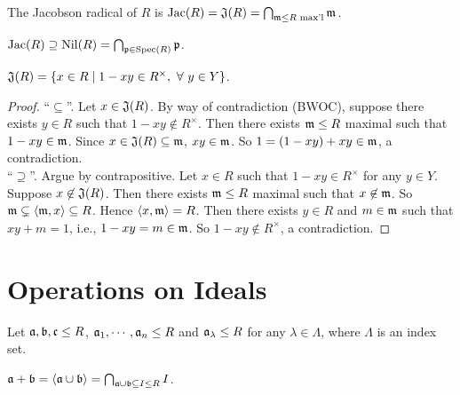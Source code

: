 \begin{definition}
    The Jacobson radical of $R$ is $\operatorname{Jac}(R) = \mathfrak{J}(R) = \bigcap_{\mathfrak{m} \leq R \text{ max'l}}\mathfrak{m}$.
\end{definition}

\begin{fact}
    $\operatorname{Jac}(R) \supseteq \operatorname{Nil}(R) = \bigcap_{\mathfrak{p} \in \operatorname{Spec}(R)}\mathfrak{p}$.
\end{fact}

\begin{proposition}
    $\mathfrak{J}(R) = \{x \in R \mid 1-xy \in R^\times, \ \forall \  y \in Y\}$.
\end{proposition}

\begin{proof}
    ``$\subseteq$''. Let $x \in \mathfrak{J}(R)$. By way of contradiction (BWOC), suppose there exists $y \in R$ such that $1-xy \not \in R^\times$. Then there exists $\mathfrak{m} \leq R$ maximal such that $1-xy \in \mathfrak{m}$. Since $x \in \mathfrak{J}(R) \subseteq \mathfrak{m}$, $xy \in \mathfrak{m}$. So $1 = (1-xy) + xy \in \mathfrak{m}$, a contradiction. \\
    ``$\supseteq$''. Argue by contrapositive. Let $x \in R$ such that $1-xy \in R^\times$ for any $y \in Y$. Suppose $x \not \in \mathfrak{J}(R)$. Then there exists $\mathfrak{m} \leq R$ maximal such that $x \not \in \mathfrak{m}$. So $\mathfrak{m} \subsetneq \langle \mathfrak{m}, x \rangle \subseteq R$. Hence $\langle x,\mathfrak{m} \rangle = R$. Then there exists $y \in R$ and $m \in \mathfrak{m}$ such that $xy+m = 1$, i.e., $1-xy = m \in \mathfrak{m}$. So $1-xy \not \in R^\times$, a contradiction.
\end{proof}

\section{Operations on Ideals}

Let $\mathfrak{a},\mathfrak{b},\mathfrak{c} \leq R$, $\mathfrak{a}_1,\cdots,\mathfrak{a}_n \leq R$ and $\mathfrak{a}_\lambda \leq R$ for any $\lambda \in \Lambda$, where $\Lambda$ is an index set.

\begin{definition}
    $\mathfrak{a} + \mathfrak{b} = \langle \mathfrak{a} \cup \mathfrak{b} \rangle = \bigcap_{\mathfrak{a} \cup \mathfrak{b} \subseteq I \leq R}I$.
\end{definition}

